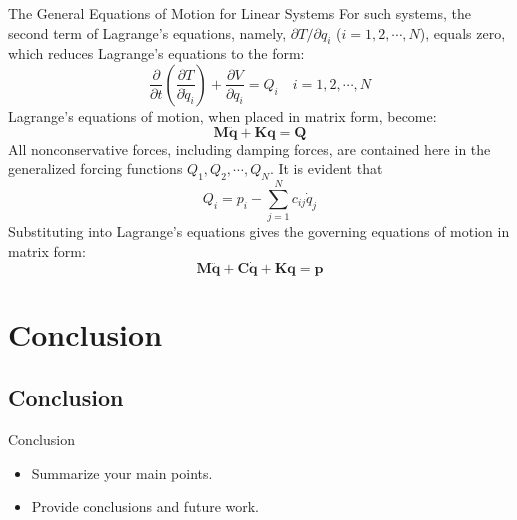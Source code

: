 \documentclass{beamer}
\begin{document}
\begin{frame}{The General Equations of Motion for Linear Systems}
  For such systems, the second term of Lagrange's equations, namely, \(\partial T / \partial q_i\) (\(i = 1, 2, \cdots, N\)), equals zero, which reduces Lagrange's equations to the form:
  \[
  \frac{\partial}{\partial t} \left( \frac{\partial T}{\partial \dot{q}_i} \right) + \frac{\partial V}{\partial q_i} = Q_i \quad i = 1, 2, \cdots, N 
  \]
  Lagrange's equations of motion, when placed in matrix form, become:
  \[
  \mathbf{M} \ddot{\mathbf{q}} + \mathbf{K} \mathbf{q} = \mathbf{Q}
  \]
  All nonconservative forces, including damping forces, are contained here in the generalized forcing functions \(Q_1, Q_2, \cdots, Q_N\). It is evident that
  \[
  Q_i = p_i - \sum_{j=1}^{N} c_{ij} \dot{q}_j 
  \]
  Substituting into Lagrange's equations gives the governing equations of motion in matrix form:
  \[
  \mathbf{M} \ddot{\mathbf{q}} + \mathbf{C} \dot{\mathbf{q}} + \mathbf{K} \mathbf{q} = \mathbf{p} 
  \]

\end{frame}



\section{Conclusion}

\subsection{Conclusion}
\begin{frame}{Conclusion}
  \begin{itemize}
    \item Summarize your main points.
    \item Provide conclusions and future work.
  \end{itemize}
\end{frame}
\end{document}

